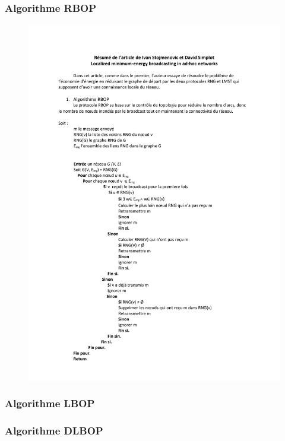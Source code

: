\subsubsection{Algorithme RBOP}
\cite{Cartigny2005}
\begin{figure}[H]

\includegraphics[scale=1]{Etat_de_l'art/source/RBOP}

\end{figure} 


\subsubsection{Algorithme LBOP}
\cite{Cartigny2005}
\subsubsection{Algorithme DLBOP}
\cite{Cartigny2004}
